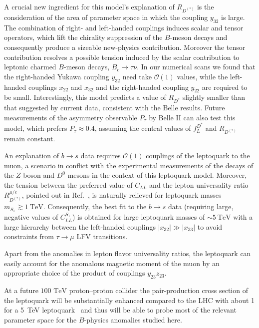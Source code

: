 A crucial new ingredient for this model's explanation of $R_{D^{(*)}}$ is the
consideration of the area of parameter space in which the coupling $y_{32}$ is
large. The combination of right- and left-handed couplings induces scalar and
tensor operators, which lift the chirality suppression of the $B$-meson decays
and consequently produce a sizeable new-physics contribution. Moreover the
tensor contribution resolves a possible tension induced by the scalar
contribution to leptonic charmed $B$-meson decays, $B_c\to\tau\nu$. In our
numerical scans we found that the right-handed Yukawa coupling $y_{32}$ need
take $\mathscr{O}(1)$ values, while the left-handed couplings $x_{22}$ and
$x_{32}$ and the right-handed coupling $y_{22}$ are required to be small.
Interestingly, this model predicts a value of $R_{D^*}$ slightly smaller than
that suggested by current data, consistent with the Belle results. Future
measurements of the asymmetry observable $P_\tau$ by Belle II can also test this
model, which prefers $P_\tau \approx 0.4$, assuming the central values of
$f_L^{D^*}$ and $R_{D^{(*)}}$ remain constant.

An explanation of $b \to s$ data requires $\mathscr{O}(1)$ couplings of the
leptoquark to the muon, a scenario in conflict with the experimental
measurements of the decays of the $Z$ boson and $D^0$ mesons in the context of
this leptoquark model. Moreover, the tension between the preferred value of
$C_{LL}$ and the lepton universality ratio $R_{D^{(*)}}^{\mu/e}$, pointed out in
Ref.~\cite{Becirevic:2016oho}, is naturally relieved for leptoquark masses
$m_{S_{1}} \gtrsim \SI{1}{\TeV}$. Consequently, the best fit to the $b \to s$
data (requiring large, negative values of $C_{LL}^{S_{1}}$) is obtained for
large leptoquark masses of $\sim \SI{5}{\TeV}$ with a large hierarchy between
the left-handed couplings $|x_{32}|\gg|x_{33}|$ to avoid constraints from
$\tau\to \mu$ LFV transitions.

Apart from the anomalies in lepton flavor universality ratios, the leptoquark
can easily account for the anomalous magnetic moment of the muon by an
appropriate choice of the product of couplings $y_{23} z_{23}$.

At a future $100 \text{ TeV}$ proton--proton collider the pair-production cross
section of the leptoquark will be substantially enhanced compared to the LHC
with about \SI{1}{\fb} for a \SI{5}{\TeV} leptoquark~\cite{Arkani-Hamed:2015vfh}
and thus will be able to probe most of the relevant parameter space for the
$B$-physics anomalies studied here.
